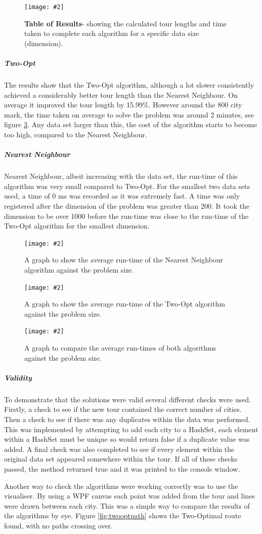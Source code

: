 \documentclass[10pt, a4paper]{article}
\newcommand{\figuremacro}[5]{
    \begin{figure}[#1]
        \centering
        \texttt{[image: \#2]}
        \caption[#3]{\textbf{#3}#4}
        \label{fig:#2}
    \end{figure}
}
\newcommand{\figuremacroF}[5]{
	\begin{figure}[#1]
		\centering
		\texttt{[image: \#2]}
		\caption[#3]{\textbf{#3}#4}
		\label{fig:#2}
	\end{figure}
}
\begin{document}
	\figuremacro{h}{Table}{Table of Results}{- showing the calculated tour lengths and time taken to complete each algorithm for a specific data size (dimension).}{1.0}
	
	\subparagraph{Two-Opt} The results show that the Two-Opt algorithm, although a lot slower consistently achieved a considerably better tour length than the Nearest Neighbour. On average it improved the tour length by 15.99\%. However around the 800 city mark, the time taken on average to solve the problem was around 2 minutes, see figure \ref{fig:twotime}. Any data set larger than this, the cost of the algorithm starts to become too high, compared to the Nearest Neighbour.
	
	\subparagraph{Nearest Neighbour} Nearest Neighbour, albeit increasing with the data set, the run-time of this algorithm was very small compared to Two-Opt. For the smallest two data sets used, a time of 0 ms was recorded as it was extremely fast. A time was only registered after the dimension of the problem was greater than 200. It took the dimension to be over 1000 before the run-time was close to the run-time of the Two-Opt algorithm for the smallest dimension.

	
	\figuremacroF{H}{nntime}{}{A graph to show the average run-time of the Nearest Neighbour algorithm against the problem size.}{0.989}
	
	\figuremacroF{H}{twotime}{}{A graph to show the average run-time of the Two-Opt algorithm against the problem size.}{0.989}
	
	\clearpage
	\figuremacroF{H}{comparison}{}{A graph to compare the average run-times of both algorithms against the problem size.}{1.0}

		\newpage
		\clearpage
	\subparagraph{Validity}
	To demonstrate that the solutions were valid several different checks were used. Firstly, a check to see if the new tour contained the correct number of cities. Then a check to see if there was any duplicates within the data was performed. This was implemented by attempting to add each city to a HashSet, each element within a HashSet must be unique so would return false if a duplicate value was added. A final check was also completed to see if every element within the original data set appeared somewhere within the tour.	If all of these checks passed, the method returned true and it was printed to the console window.
	
	Another way to check the algorithms were working correctly was to use the visualiser. By using a WPF canvas each point was added from the tour and lines were drawn between each city. This was a simple way to compare the results of the algorithms by eye. Figure \ref{fig:twooptpath} shows the Two-Optimal route found, with no paths crossing over. 
	
\end{document}
